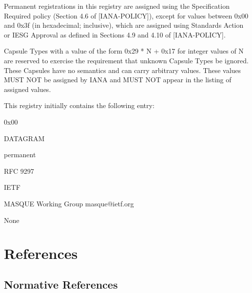 \documentclass{article}
\begin{document}
Permanent registrations in this registry are assigned using the
Specification Required policy (Section 4.6 of [IANA-POLICY]), except
for values between 0x00 and 0x3f (in hexadecimal; inclusive), which
are assigned using Standards Action or IESG Approval as defined in
Sections 4.9 and 4.10 of [IANA-POLICY].

Capsule Types with a value of the form 0x29 * N + 0x17 for integer
values of N are reserved to exercise the requirement that unknown
Capsule Types be ignored.  These Capsules have no semantics and can
carry arbitrary values.  These values MUST NOT be assigned by IANA
and MUST NOT appear in the listing of assigned values.

This registry initially contains the following entry:

\begin{description}[style=unboxed, leftmargin=0.5cm]
\item[Value:]  0x00
\item[Capsule Type:]  DATAGRAM
\item[Status:]  permanent
\item[Reference:]  RFC 9297
\item[Change Controller:]  IETF
\item[Contact:]  MASQUE Working Group masque@ietf.org
\item[Notes:]  None
\end{description}

\section{References}

\subsection{Normative References}
\end{document}
